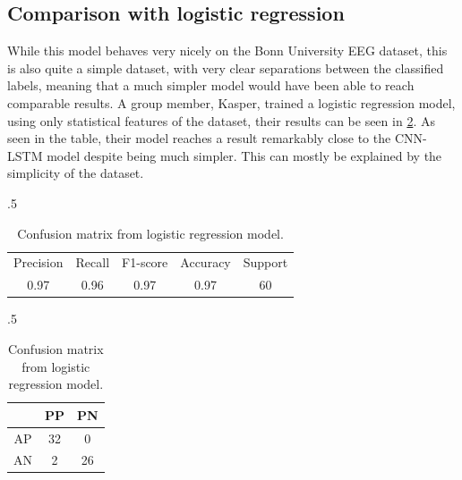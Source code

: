 \subsection{Comparison with logistic regression}
While this model behaves very nicely on the Bonn University EEG dataset, this is also quite a simple dataset, with very clear separations between the classified labels, meaning that a much simpler model would have been able to reach comparable results. A group member, Kasper, trained a logistic regression model, using only statistical features of the dataset, their results can be seen in \cref{tab:kasper}. As seen in the table, their model reaches a result remarkably close to the CNN-LSTM model despite being much simpler. This can mostly be explained by the simplicity of the dataset.

\begin{table}[h]
    \caption{Seizure classification results of logistic regression model, implemented by group member}
    \label{tab:kasper}
    \begin{subtable}{.5\linewidth}
      \centering
        \caption{Performance metrics from logistic regression model.}
        \begin{tabular}{|c|c|c|c|c|}
            \hline
            Precision & Recall & F1-score & Accuracy & Support \\
            0.97 & 0.96 & 0.97 & 0.97 & 60 \\
            \hline
        \end{tabular}
    \end{subtable}%
    \begin{subtable}{.5\linewidth}
      \centering
        \caption{Confusion matrix from logistic regression model.}
        \begin{tabular}{c|c c}
                & PP & PN \\
            \hline
            AP  & 32 & 0  \\
            AN  & 2  & 26 \\
        \end{tabular}
    \end{subtable} 
\end{table}
